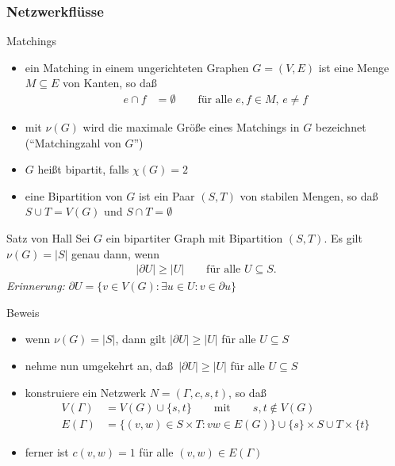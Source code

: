 \documentclass[aspectratio=1610, 11pt]{beamer}
\newcommand{\mytitle}{Netzwerkfl\"usse}
\begin{document}
\begin{frame}\frametitle{\mytitle}
	\begin{overprint}
		\begin{exampleblock}{Matchings}
			\begin{itemize}
				\item ein \alert{Matching} in einem ungerichteten Graphen $G=(V,E)$ ist eine Menge $M\subseteq E$ von Kanten, so da\ss
					\begin{align*}
						e\cap f&=\emptyset\qquad\mbox{f\"ur alle }e,f\in M,\,e\neq f
					\end{align*}
				\item mit $\nu(G)$ wird die maximale Gr\"o\ss e eines Matchings in $G$ bezeichnet (``Matchingzahl von $G$'')
				\item $G$ hei\ss t \alert{bipartit}, falls $\chi(G)=2$
				\item eine \alert{Bipartition} von $G$ ist ein Paar $(S,T)$ von stabilen Mengen, so da\ss\ $S\cup T=V(G)$ und $S\cap T=\emptyset$
			\end{itemize}
		\end{exampleblock}
		\begin{exampleblock}{Satz von Hall}
			Sei $G$ ein bipartiter Graph mit Bipartition $(S,T)$.
			Es gilt $\nu(G)=|S|$ genau dann, wenn
			\begin{align*}
				|\partial U|\geq|U|\qquad\mbox{f\"ur alle }U\subseteq S.
			\end{align*}
			\emph{Erinnerung:} $\partial U=\{v\in V(G):\exists u\in U:v\in\partial u\}$
		\end{exampleblock}
		\begin{exampleblock}{Beweis}
			\begin{itemize}
				\item wenn $\nu(G)=|S|$, dann gilt $|\partial U|\geq|U|$ f\"ur alle $U\subseteq S$
				\item nehme nun umgekehrt an, da\ss\ $|\partial U|\geq|U|$ f\"ur alle $U\subseteq S$
				\item konstruiere ein Netzwerk $N=(\Gamma,c,s,t)$, so da\ss\
					\begin{align*}
						V(\Gamma)&=V(G)\cup\{s,t\}\qquad\mbox{mit}\qquad s,t\not\in V(G)\\
						E(\Gamma)&=\{(v,w)\in S\times T:vw\in E(G)\}\cup\{s\}\times S\cup T\times\{t\}
					\end{align*}
				\item ferner ist $c(v,w)=1$ f\"ur alle $(v,w)\in E(\Gamma)$

\end{itemize}
\end{exampleblock}
\end{overprint}
\end{frame}
\end{document}
